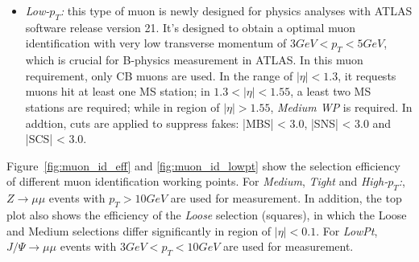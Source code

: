 \begin{itemize}
	\item \textit{Low-$p_{T}$:} this type of muon is newly designed for physics analyses with ATLAS software release version 21. It's designed to obtain a optimal muon identification with very low transverse momentum of $3 GeV < p_{T} < 5 GeV$, which is crucial for B-physics measurement in ATLAS. 
	In this muon requirement, only CB muons are used. In the range of $|\eta| < 1.3$, it requests muons hit at least one MS station; in $1.3 < |\eta| < 1.55$, a least two MS stations are required; while in region of $|\eta| > 1.55$, \textit{Medium WP} is required. In addtion, cuts are applied to suppress fakes: |MBS| < 3.0, |SNS| < 3.0 and |SCS| < 3.0.
\end{itemize}

Figure~\ref{fig:muon_id_eff} and \ref{fig:muon_id_lowpt} show the selection efficiency of different muon identification working points. For \textit{Medium}, \textit{Tight} and \textit{High-$p_{T}$:}, $Z \rightarrow \mu\mu$ events with $p_{T} > 10 GeV$ are used for measurement. 
In addition, the top plot also shows the efficiency of the \textit{Loose} selection (squares), in which the Loose and Medium selections differ significantly in region of $|\eta| < 0.1$.
For \textit{LowPt}, $J/\Psi \rightarrow \mu\mu$ events with $3 GeV < p_{T} < 10 GeV$ are used for measurement.
